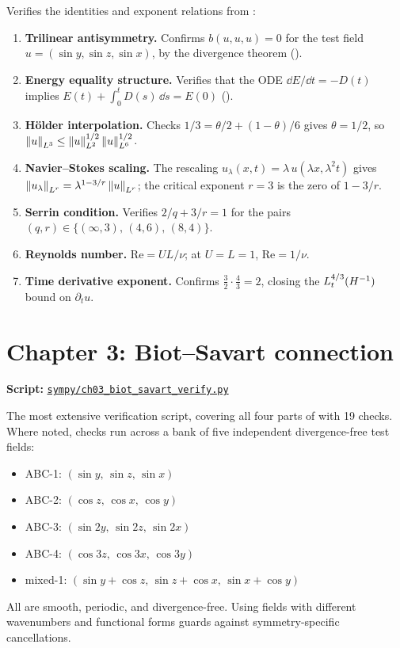 \medskip\noindent
Verifies the identities and exponent relations from :
\begin{enumerate}[label=(\roman*)]
  \item \textbf{Trilinear antisymmetry.}  Confirms $b(u,u,u) = 0$ for the
    test field $u = (\sin y, \sin z, \sin x)$, by the divergence theorem
    ().
  \item \textbf{Energy equality structure.}  Verifies that the ODE
    $\dd E/\dd t = -D(t)$ implies
    $E(t) + \int_0^t D(s)\,\dd s = E(0)$
    ().
  \item \textbf{H\"{o}lder interpolation.}  Checks
    $1/3 = \theta/2 + (1-\theta)/6$ gives $\theta = 1/2$, so
    $\left\lVert u \right\rVert_{L^{3}} \leq \left\lVert u \right\rVert_{L^{2}}^{1/2}\left\lVert u \right\rVert_{L^{6}}^{1/2}$.
  \item \textbf{Navier--Stokes scaling.}  The rescaling
    $u_{\lambda}(x,t) = \lambda\,u(\lambda x, \lambda^2 t)$ gives
    $\left\lVert u_\lambda \right\rVert_{L^{r}} = \lambda^{1 - 3/r}\left\lVert u \right\rVert_{L^{r}}$;
    the critical exponent $r = 3$ is the zero of $1 - 3/r$.
  \item \textbf{Serrin condition.}  Verifies $2/q + 3/r = 1$ for the pairs
    $(q,r) \in \{(\infty,3),\,(4,6),\,(8,4)\}$.
  \item \textbf{Reynolds number.}  $\mathrm{Re} = UL/\nu$; at $U = L = 1$,
    $\mathrm{Re} = 1/\nu$.
  \item \textbf{Time derivative exponent.}  Confirms $\tfrac{3}{2} \cdot \tfrac{4}{3} = 2$,
    closing the $L^{4/3}_t(H^{-1})$ bound on $\partial_t u$.
\end{enumerate}

\section{Chapter 3: Biot--Savart connection}
\label{sec:sympy-ch03}

\textbf{Script:}
\href{https://github.com/alejandro-soto-franco/navier-stokes/blob/main/sympy/ch03_biot_savart_verify.py}%
{\texttt{sympy/ch03\_biot\_savart\_verify.py}}

\medskip\noindent
The most extensive verification script, covering all four parts of 
with 19 checks.  Where noted, checks run across a bank of five independent
divergence-free test fields:
\begin{itemize}
  \item ABC-1: $(\sin y,\, \sin z,\, \sin x)$
  \item ABC-2: $(\cos z,\, \cos x,\, \cos y)$
  \item ABC-3: $(\sin 2y,\, \sin 2z,\, \sin 2x)$
  \item ABC-4: $(\cos 3z,\, \cos 3x,\, \cos 3y)$
  \item mixed-1: $(\sin y + \cos z,\, \sin z + \cos x,\, \sin x + \cos y)$
\end{itemize}
All are smooth, periodic, and divergence-free.  Using fields with different wavenumbers
and functional forms guards against symmetry-specific cancellations.

